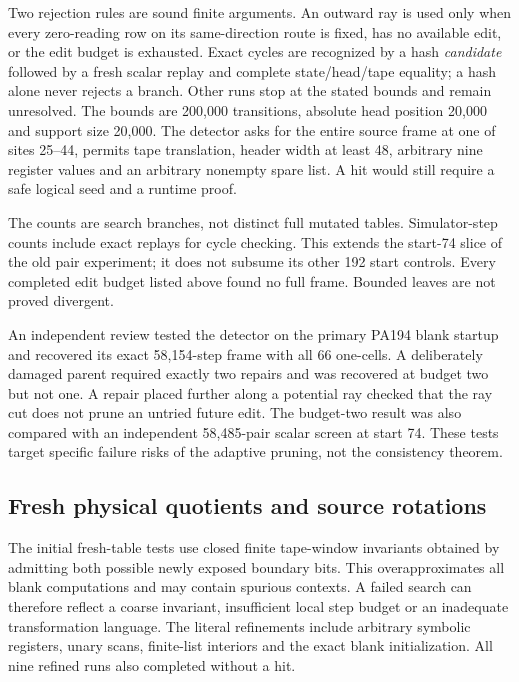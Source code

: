 \documentclass[11pt,letterpaper]{article}
\begin{document}
Two rejection rules are sound finite arguments. An outward ray is used
only when every zero-reading row on its same-direction route is fixed,
has no available edit, or the edit budget is exhausted. Exact cycles
are recognized by a hash \emph{candidate} followed by a fresh scalar
replay and complete state/head/tape equality; a hash alone never rejects
a branch. Other runs stop at the stated bounds and remain unresolved.
The bounds are 200,000 transitions, absolute head position 20,000 and
support size 20,000. The detector asks for the entire source frame at
one of sites 25--44, permits tape translation, header width at least 48,
arbitrary nine register values and an arbitrary nonempty spare list.
A hit would still require a safe logical seed and a runtime proof.



The counts are search branches, not distinct full mutated tables.
Simulator-step counts include exact replays for cycle checking. This
extends the start-74 slice of the old pair experiment; it does not
subsume its other 192 start controls. Every completed edit budget listed
above found no full frame. Bounded leaves are not proved divergent.

An independent review tested the detector on the primary PA194 blank
startup and recovered its exact 58,154-step frame with all 66 one-cells.
A deliberately damaged parent required exactly two repairs and was
recovered at budget two but not one. A repair placed further along a
potential ray checked that the ray cut does not prune an untried future
edit. The budget-two result was also compared with an independent
58,485-pair scalar screen at start 74. These tests target specific
failure risks of the adaptive pruning, not the consistency theorem.

\subsection{Fresh physical quotients and source rotations}



The initial fresh-table tests use closed finite tape-window invariants
obtained by admitting both possible newly exposed boundary bits. This
overapproximates all blank computations and may contain spurious contexts.
A failed search can therefore reflect a coarse invariant, insufficient
local step budget or an inadequate transformation language. The literal
refinements include arbitrary symbolic registers, unary scans, finite-list
interiors and the exact blank initialization. All nine refined runs also
completed without a hit.
\end{document}
